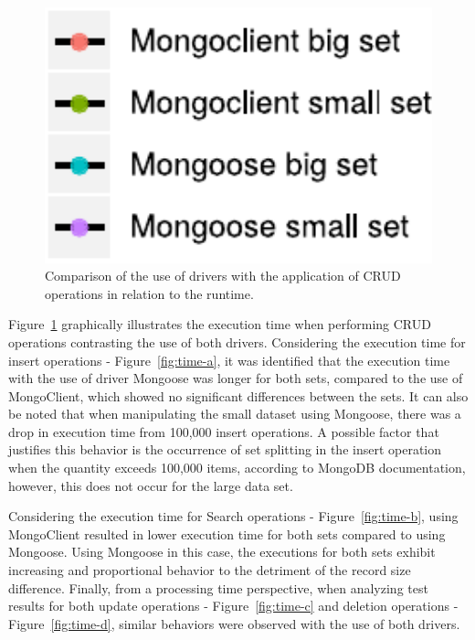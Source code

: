 \documentclass{svproc}
\begin{document}
\begin{figure}[!ht]
{\begin{minipage}[1\width]{0.12\textwidth}
            \includegraphics[width=1\textwidth]{images/legend.pdf}
        \end{minipage}} 
    \caption{Comparison of the use of drivers with the application of CRUD operations in relation to the runtime.}
    \label{fig:time}
\end{figure}

Figure~\ref{fig:time} graphically illustrates the execution time when performing CRUD operations contrasting the use of both drivers. Considering the execution time for insert operations - Figure~\ref{fig:time-a}, it was identified that the execution time with the use of driver Mongoose was longer for both sets, compared to the use of MongoClient, which showed no significant differences between the sets. It can also be noted that when manipulating the small dataset using Mongoose, there was a drop in execution time from 100,000 insert operations. A possible factor that justifies this behavior is the occurrence of set splitting in the insert operation when the quantity exceeds 100,000 items, according to MongoDB documentation, however, this does not occur for the large data set.

Considering the execution time for Search operations - Figure~\ref{fig:time-b}, using MongoClient resulted in lower execution time for both sets compared to using Mongoose. Using Mongoose in this case, the executions for both sets exhibit increasing and proportional behavior to the detriment of the record size difference. Finally, from a processing time perspective, when analyzing test results for both update operations - Figure~\ref{fig:time-c} and deletion operations - Figure~\ref{fig:time-d}, similar behaviors were observed with the use of both drivers.
\end{document}
